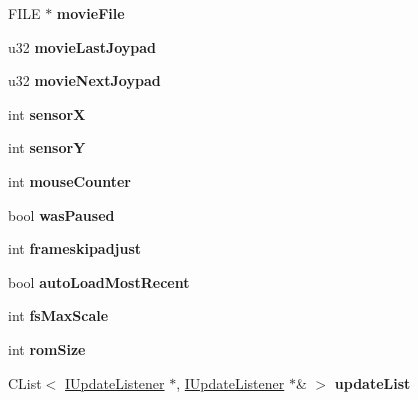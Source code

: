 \begin{DoxyCompactItemize}
\item 
\mbox{\label{class_v_b_a_abf9ac3c15536552d322f20a2dad1f519}} 
F\+I\+LE $\ast$ {\bfseries movie\+File}
\item 
\mbox{\label{class_v_b_a_a911d9dbab0a3565480a29b8149099ed1}} 
u32 {\bfseries movie\+Last\+Joypad}
\item 
\mbox{\label{class_v_b_a_ae528fc1f675add097200192deecb4236}} 
u32 {\bfseries movie\+Next\+Joypad}
\item 
\mbox{\label{class_v_b_a_a070ab23839c3e1b67c29c70a34c87b1a}} 
int {\bfseries sensorX}
\item 
\mbox{\label{class_v_b_a_a090bef0a0f7702b275e46ee14a130359}} 
int {\bfseries sensorY}
\item 
\mbox{\label{class_v_b_a_af042fea29b45069293e90bef70c7839a}} 
int {\bfseries mouse\+Counter}
\item 
\mbox{\label{class_v_b_a_a3c2e2ea8cb921007fcf2764da22c06e0}} 
bool {\bfseries was\+Paused}
\item 
\mbox{\label{class_v_b_a_a68ed258ae51274c7dcf72cf866d43733}} 
int {\bfseries frameskipadjust}
\item 
\mbox{\label{class_v_b_a_aa523f068e8e2939fa2907a95f0881bde}} 
bool {\bfseries auto\+Load\+Most\+Recent}
\item 
\mbox{\label{class_v_b_a_a1a4cfe79496ea8a029bc591f33c489d6}} 
int {\bfseries fs\+Max\+Scale}
\item 
\mbox{\label{class_v_b_a_ab7d47241ad4bc8c0e6717770797e6d57}} 
int {\bfseries rom\+Size}
\item 
\mbox{\label{class_v_b_a_ad1bea05b3d5cd2fe5c3ea3c98db33ddc}} 
C\+List$<$ \mbox{\hyperlink{class_i_update_listener}{I\+Update\+Listener}} $\ast$, \mbox{\hyperlink{class_i_update_listener}{I\+Update\+Listener}} $\ast$\& $>$ {\bfseries update\+List}
\item 
\mbox{\label{class_v_b_a_a61d96a23607a428ad97f74f4b750fcc2}} 

\end{DoxyCompactItemize}
